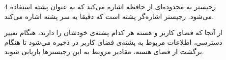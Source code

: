 \begin{itemize}
	\item [4] 
	رجیستر 
	به محدوده‌ای از حافظه اشاره می‌کند که به عنوان پشته استفاده می‌شود.
	رجیستر 
	اشاره‌گر پشته است که دقیقا یه سر پشته اشاره می‌کند.
	
	از آنجا که فضای کاربر و هسته هر کدام پشته‌ی خودشان را دارند، هنگام تغییر دسترسی، اطلاعات مربوط به پشته‌ی فضای کاربر در 
	ذخیره می‌شود تا هنگام برگشت از فضای هسته، مقادیر مروبط به این رجیستر‌ها بازیابی شوند.
\end{itemize}
